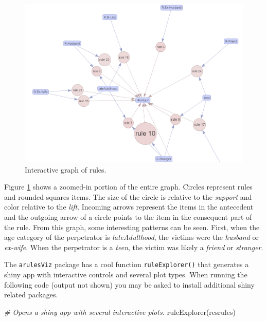 \documentclass[
  11pt,
]{krantz}
\newenvironment{Shaded}{\begin{snugshade}}{\end{snugshade}}
\newcommand{\CommentTok}[1]{\textcolor[rgb]{0.37,0.37,0.37}{\textit{#1}}}
\newcommand{\FunctionTok}[1]{\textcolor[rgb]{0,0,0}{#1}}
\newcommand{\NormalTok}[1]{#1}
\begin{document}
\begin{figure}

{\centering \includegraphics[width=0.9\linewidth]{images/rules_graph} 

}

\caption{Interactive graph of rules.}\label{fig:rulesGraphInt}
\end{figure}

Figure \ref{fig:rulesGraphInt} shows a zoomed-in portion of the entire graph. Circles represent rules and rounded squares items. The size of the circle is relative to the \emph{support} and color relative to the \emph{lift}. Incoming arrows represent the items in the antecedent and the outgoing arrow of a circle points to the item in the consequent part of the rule. From this graph, some interesting patterns can be seen. First, when the age category of the perpetrator is \emph{lateAdulthood}, the victims were the \emph{husband} or \emph{ex-wife}. When the perpetrator is a \emph{teen}, the victim was likely a \emph{friend} or \emph{stranger}.

The \texttt{arulesViz} package has a cool function \texttt{ruleExplorer()} that generates a shiny app with interactive controls and several plot types. When running the following code (output not shown) you may be asked to install additional shiny related packages.

\begin{Shaded}
\begin{Highlighting}[]
\CommentTok{\# Opens a shiny app with several interactive plots.}
\FunctionTok{ruleExplorer}\NormalTok{(resrules)}
\end{Highlighting}
\end{Shaded}
\end{document}
